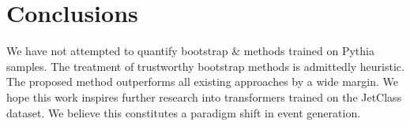 \section{Conclusions}\label{sec:conclusions}

We have not attempted to quantify bootstrap & methods trained on Pythia
samples. The treatment of trustworthy bootstrap methods is admittedly
heuristic. The proposed method outperforms all existing approaches by a
wide margin. We hope this work inspires further research into
transformers trained on the JetClass dataset. We believe this
constitutes a paradigm shift in event generation.

